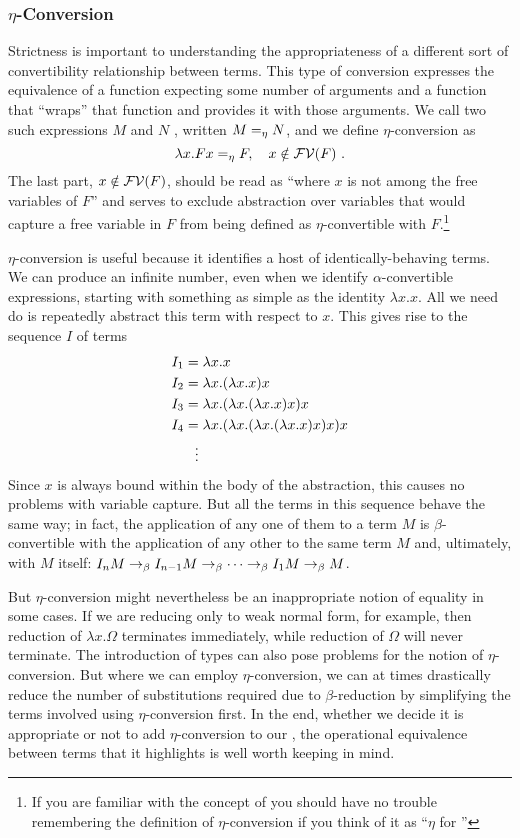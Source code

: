 \subsubsection{\texorpdfstring{$\eta$-Conversion}{Eta-Conversion}}\label{untyped:eta}
Strictness is important to understanding the appropriateness of a different sort of convertibility relationship between terms. This type of con\-ver\-sion expresses the equivalence of a function expecting some number of arguments and a function that ``wraps'' that function and provides it with those arguments. We call two such expressions $M$ and $N$ , written $M =_{\eta} N$, and we define $\eta$-con\-ver\-sion as
\[
\lambda x. F x =_{\eta} F,\quad x \notin \mathcal{FV}(F)\text{ .}
\]
The last part, $x \notin \mathcal{FV}(F)$, should be read as ``where $x$ is not among the free variables of $F$'' and serves to exclude abstraction over variables that would capture a free variable in $F$ from being defined as $\eta$-con\-vert\-i\-ble with $F$.\footnote{If you are familiar with the concept of  you should have no trouble remembering the definition of $\eta$-con\-ver\-sion if you think of it as ``$\eta$ for ''}

$\eta$-con\-ver\-sion is useful because it identifies a host of iden\-ti\-cally-be\-having terms. We can produce an infinite number, even when we identify $\alpha$-con\-vert\-i\-ble expressions, starting with something as simple as the identity $\lambda x. x$. All we need do is repeatedly abstract this term with respect to $x$. This gives rise to the sequence $I$ of terms 
\begin{align*}
I_{1} &= \lambda x.x\\
I_{2} &= \lambda x . (\lambda x.x) x\\
I_{3} &= \lambda x . (\lambda x . (\lambda x.x) x) x\\
I_{4} &= \lambda x . (\lambda x . (\lambda x . (\lambda x.x) x) x) x\\
&\hphantom{=}\vdots
\end{align*}
Since $x$ is always bound within the body of the abstraction, this causes no problems with variable capture. But all the terms in this sequence behave the same way; in fact, the application of any one of them to a term $M$ is $\beta$-con\-vert\-i\-ble with the application of any other to the same term $M$ and, ultimately, with $M$ itself: $I_{n} M \betared I_{n-1} M \betared \dotsb \betared I_{1} M \betared M$.

But $\eta$-con\-ver\-sion might nevertheless be an inappropriate notion of equality in some cases. If we are reducing only to weak normal form, for example, then reduction of $\lambda x . \Omega$ terminates immediately, while reduction of $\Omega$ will never terminate. The introduction of types can also pose problems for the notion of $\eta$-con\-ver\-sion. But where we can employ $\eta$-con\-ver\-sion, we can at times drastically reduce the number of substitutions required due to $\beta$-re\-duc\-tion by simplifying the terms involved using $\eta$-con\-ver\-sion first. In the end, whether we decide it is appropriate or not to add $\eta$-con\-ver\-sion to our \lambdacalc{}, the operational equivalence between terms that it highlights is well worth keeping in mind.
